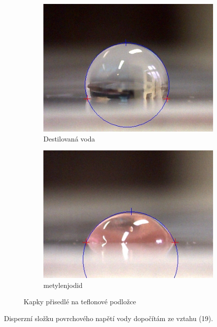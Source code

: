 \documentclass[a4paper,11pt]{article}
\begin{document}
\begin{figure}[htpb]
  \centering
  \begin{subfigure}[b]{0.45\textwidth}
    \includegraphics[width=\textwidth]{kapky/voda_001p_crop.jpg}
    \caption{Destilovaná voda}
  \end{subfigure}
  \hfill
  \begin{subfigure}[b]{0.45\textwidth}
    \includegraphics[width=\textwidth]{kapky/voda_002p_crop.jpg}
    \caption{metylenjodid}
  \end{subfigure}
  \caption{Kapky přisedlé na teflonové podložce}
\end{figure}

Disperzní složku povrchového napětí vody dopočítám ze vztahu (19).
\end{document}
